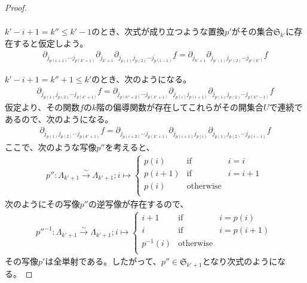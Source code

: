 \documentclass[dvipdfmx]{jsarticle}
\begin{document}
\begin{proof}
\begin{align*}
\end{align*}\par
$k' - i + 1 = k'' \leq k' - 1$のとき、次式が成り立つような置換$p'$がその集合$\mathfrak{S}_{k'}$に存在すると仮定しよう。
\begin{align*}
\partial_{j_{p(i + 1)}\cdots j_{p\left( k' + 1 \right)}}\partial_{j_{k' + 1}}\partial_{j_{p(1)}j_{p(2)}\cdots j_{p(i - 1)}}f = \partial_{j_{k' + 1}}\partial_{j_{p'(1)}j_{p'(2)}\cdots j_{p'\left( k' \right)}}f
\end{align*}\par
$k' - i + 1 = k'' + 1 \leq k'$のとき、次のようになる。
\begin{align*}
\partial_{j_{p(1)}j_{p(2)}\cdots j_{p\left( k' + 1 \right)}}f = \partial_{j_{p\left( k'' + 2 \right)}\cdots j_{p\left( k' + 1 \right)}}\partial_{j_{p(i)}j_{p(i + 1)}}\partial_{j_{p(1)}j_{p(2)}\cdots j_{p\left( k'' - 1 \right)}}f
\end{align*}
仮定より、その関数$f$の$k$階の偏導関数が存在してこれらがその開集合$U$で連続であるので、次のようになる。
\begin{align*}
\partial_{j_{p(1)}j_{p(2)}\cdots j_{p\left( k' + 1 \right)}}f = \partial_{j_{p(i + 2)}\cdots j_{p\left( k' + 1 \right)}}\partial_{j_{p(i + 1)}j_{p(i)}}\partial_{j_{p(1)}j_{p(2)}\cdots j_{p(i - 1)}}f
\end{align*}
ここで、次のような写像$p''$を考えると、
\begin{align*}
p'':\varLambda_{k' + 1}\overset{\sim}{\rightarrow}\varLambda_{k' + 1};i \mapsto \left\{ \begin{matrix}
p(i) & \mathrm{if} & i = i \\
p(i + 1) & \mathrm{if} & i = i + 1 \\
p(i) & \mathrm{otherwise} & \  \\
\end{matrix} \right.\ 
\end{align*}
次のようにその写像$p''$の逆写像が存在するので、
\begin{align*}
{p''}^{- 1}:\varLambda_{k' + 1}\overset{\sim}{\rightarrow}\varLambda_{k' + 1};i \mapsto \left\{ \begin{matrix}
i + 1 & \mathrm{if} & i = p(i) \\
i & \mathrm{if} & i = p(i + 1) \\
p^{- 1}(i) & \mathrm{otherwise} & \  \\
\end{matrix} \right.\ 
\end{align*}
その写像$p'$は全単射である。したがって、$p'' \in \mathfrak{S}_{k' + 1}$となり次式のようになる。

\end{proof}
\end{document}
